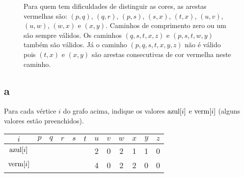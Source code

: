 \begin{figure}[H]
    \centering
    

    \caption{Para quem tem dificuldades de distinguir as cores, as arestas vermelhas são: $(p, q)$, $(q, r)$, $(p, s)$, $(s, x)$, $(t, x)$, $(u, v)$, $(u, w)$, $(w, x)$ e $(x, y)$. Caminhos de comprimento zero ou um são sempre válidos. Os caminhos $(q, s, t, x, z)$ e $(p, s, t, w, y)$ também são válidos. Já o caminho $(p, q, s, t, x, y, z)$ não é válido pois $(t, x)$ e $(x, y)$ são arestas consecutivas de cor vermelha neste caminho.}
\end{figure}

\subsection{a} Para cada vértice $i$ do grafo acima, indique os valores $\mathrm{azul}[i]$ e $\mathrm{verm}[i]$ (alguns valores estão preenchidos).

\itemdsep[0.25]

\begin{table}[H]
    \centering
    \begin{tabular}{|c|c|c|c|c|c|c|c|c|c|c|c|}
        \hline
        $i$ & $p$ & $q$ & $r$ & $s$ & $t$ & $u$ & $v$ & $w$ & $x$ & $y$ & $z$ \\
        \hline
        $\mathrm{azul}[i]$ & & & & & & 2 & 0 & 2 & 1 & 1 & 0 \\
        \hline
        $\mathrm{verm}[i]$ & & & & & & 4 & 0 & 2 & 2 & 0 & 0 \\
        \hline
    \end{tabular}
\end{table}
